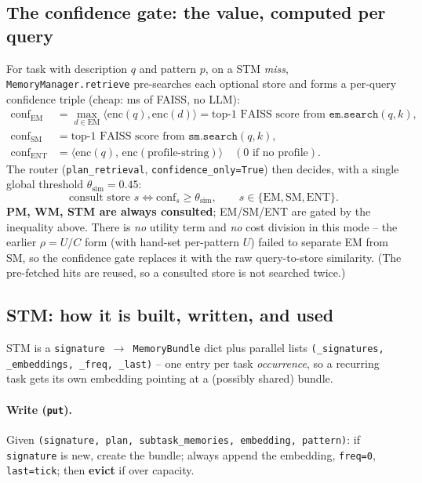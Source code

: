\subsection{The confidence gate: the value, computed per query}
\label{sec:gl-gate}
For task with description $q$ and pattern $p$, on a STM \emph{miss}, \texttt{MemoryManager.retrieve}
pre-searches each optional store and forms a per-query confidence triple (cheap: ms of FAISS, no
LLM):
\begin{align}
\mathrm{conf}_{\text{EM}} &= \max_{d\in\text{EM}} \langle \mathrm{enc}(q),\mathrm{enc}(d)\rangle
   = \text{top-1 FAISS score from } \texttt{em.search}(q,k),\\
\mathrm{conf}_{\text{SM}} &= \text{top-1 FAISS score from } \texttt{sm.search}(q,k),\\
\mathrm{conf}_{\text{ENT}} &= \langle \mathrm{enc}(q),\,\mathrm{enc}(\text{profile-string})\rangle
   \quad(\text{0 if no profile}).
\end{align}
The router (\texttt{plan\_retrieval}, \texttt{confidence\_only=True}) then decides, with a single
global threshold $\theta_{\text{sim}}=0.45$:
\[
\text{consult store } s \iff \mathrm{conf}_s \ge \theta_{\text{sim}}, \qquad s\in\{\text{EM},\text{SM},\text{ENT}\}.
\]
\textbf{PM, WM, STM are always consulted}; EM/SM/ENT are gated by the inequality above. There is
\emph{no} utility term and \emph{no} cost division in this mode -- the earlier $\rho=U/C$ form (with
hand-set per-pattern $U$) failed to separate EM from SM, so the confidence gate replaces it with the
raw query-to-store similarity. (The pre-fetched hits are reused, so a consulted store is not searched
twice.)

\subsection{STM: how it is built, written, and used}
\label{sec:gl-stm}
STM is a \texttt{signature $\to$ MemoryBundle} dict plus parallel lists
\texttt{(\_signatures, \_embeddings, \_freq, \_last)} -- one entry per task \emph{occurrence}, so a
recurring task gets its own embedding pointing at a (possibly shared) bundle.

\paragraph{Write (\texttt{put}).} Given \texttt{(signature, plan, subtask\_memories, embedding,
pattern)}: if \texttt{signature} is new, create the bundle; always append the embedding,
\texttt{freq=0}, \texttt{last=tick}; then \textbf{evict} if over capacity.


